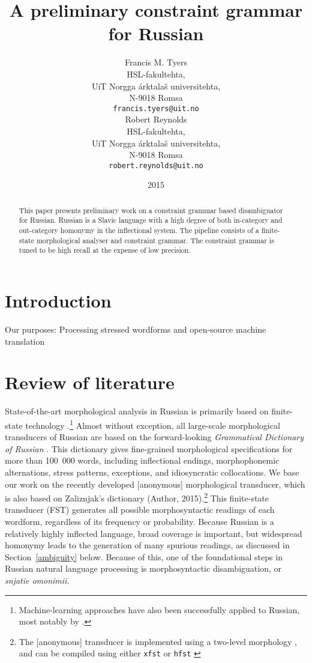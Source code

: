 \documentclass[11pt]{article}
\title{A preliminary constraint grammar for Russian}
\author{Francis M. Tyers \\
  HSL-fakultehta, \\
  UiT Norgga árktalaš universitehta, \\
  N-9018 Romsa \\
  {\tt francis.tyers@uit.no} \\\And
  Robert Reynolds \\
  HSL-fakultehta, \\
  UiT Norgga árktalaš universitehta, \\
  N-9018 Romsa \\
  {\tt robert.reynolds@uit.no} \\}
\date{2015}
\begin{document}
\maketitle
\begin{abstract}
 This paper presents preliminary work on a constraint
 grammar based disambiguator for Russian. Russian is
 a Slavic language with a high degree of both in-category
 and out-category homonymy in the inflectional system.
 The pipeline consists of a finite-state morphological
 analyser and constraint grammar. The constraint 
 grammar is tuned to be high recall at the expense of 
 low precision.
\end{abstract}

\section{Introduction}

Our purposes: Processing stressed wordforms and open-source machine translation

\cite{Karlsson-90}


\section{Review of literature}

State-of-the-art morphological analysis in Russian is primarily based on
finite-state technology
\cite{Nozhov-03,Segalovich-03}.\footnote{Machine-learning approaches have also been successfully applied to Russian, most notably by 
.} Almost without exception, all large-scale 
morphological transducers of Russian are based on the
forward-looking \emph{Grammatical Dictionary of Russian} \cite{Zaliznjak-77}.
This dictionary gives fine-grained morphological specifications for more than
100~000 words, including inflectional endings, morphophonemic alternations, 
stress patterns, exceptions, and idiosyncratic collocations.
We base our work on the recently developed [anonymous] morphological transducer, which is also based on Zaliznjak's dictionary (Author, 2015).\footnote{The [anonymous] transducer is implemented using a two-level 
morphology \cite{Koskenniemi-84}, and can be compiled using either {\tt xfst}
\cite{Beesley.Karttunen-03} or {\tt hfst} \cite{hfst-11}} This finite-state transducer (FST) generates all possible 
morphosyntactic readings of each wordform, regardless of its frequency or probability. Because Russian is a relatively highly inflected language, broad coverage is important, but widespread homonymy leads to the generation of many spurious readings, as discussed in Section~\ref{ambiguity} below. Because of this, one of the foundational steps in Russian natural language processing is morphosyntactic disambiguation, or \emph{snjatie omonimii}.
\end{document}
